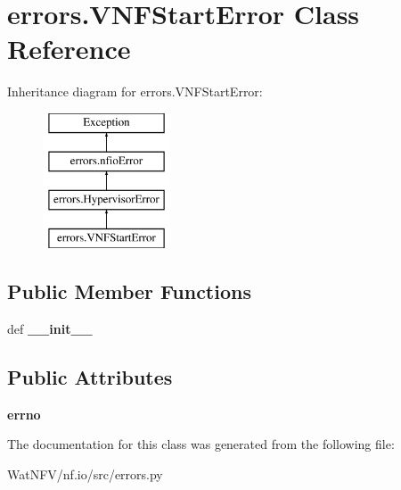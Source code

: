 \hypertarget{classerrors_1_1VNFStartError}{\section{errors.\-V\-N\-F\-Start\-Error Class Reference}
\label{classerrors_1_1VNFStartError}
}
Inheritance diagram for errors.\-V\-N\-F\-Start\-Error\-:\begin{figure}[H]
\begin{center}
\leavevmode
\includegraphics[height=4.000000cm]{classerrors_1_1VNFStartError}
\end{center}
\end{figure}
\subsection*{Public Member Functions}
\begin{DoxyCompactItemize}
\item 
\hypertarget{classerrors_1_1VNFStartError_a962405d619aa42c3732e6273a0e85800}{def {\bfseries \-\_\-\-\_\-init\-\_\-\-\_\-}}\label{classerrors_1_1VNFStartError_a962405d619aa42c3732e6273a0e85800}

\end{DoxyCompactItemize}
\subsection*{Public Attributes}
\begin{DoxyCompactItemize}
\item 
\hypertarget{classerrors_1_1VNFStartError_afffa090d568ffafa017d96efa6266a3f}{{\bfseries errno}}\label{classerrors_1_1VNFStartError_afffa090d568ffafa017d96efa6266a3f}

\end{DoxyCompactItemize}


The documentation for this class was generated from the following file\-:\begin{DoxyCompactItemize}
\item 
Wat\-N\-F\-V/nf.\-io/src/errors.\-py\end{DoxyCompactItemize}
